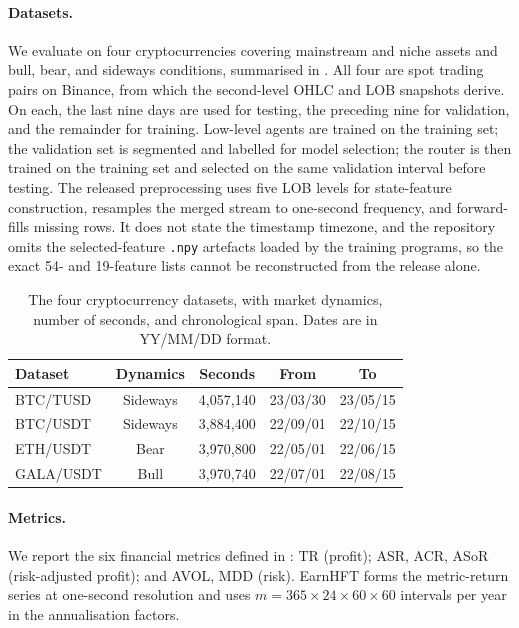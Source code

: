 \paragraph{Datasets.} We evaluate on four cryptocurrencies covering mainstream and niche assets and bull, bear, and sideways conditions, summarised in . All four are spot trading pairs on Binance, from which the second-level OHLC and LOB snapshots derive. On each, the last nine days are used for testing, the preceding nine for validation, and the remainder for training. Low-level agents are trained on the training set; the validation set is segmented and labelled for model selection; the router is then trained on the training set and selected on the same validation interval before testing. The released preprocessing uses five LOB levels for state-feature construction, resamples the merged stream to one-second frequency, and forward-fills missing rows. It does not state the timestamp timezone, and the repository omits the selected-feature \texttt{.npy} artefacts loaded by the training programs, so the exact 54- and 19-feature lists cannot be reconstructed from the release alone.

\begin{table}[!htb]
\setlength\tabcolsep{6pt}
\centering
\caption[EarnHFT dataset statistics.]{The four cryptocurrency datasets, with market dynamics, number of seconds, and chronological span. Dates are in YY/MM/DD format.}
\label{tab:earnhft_dataset}
\begin{tabular}{lcccc}
\toprule
\textbf{Dataset} & \textbf{Dynamics} & \textbf{Seconds} & \textbf{From} & \textbf{To} \\
\midrule
BTC/TUSD & Sideways & 4{,}057{,}140 & 23/03/30 & 23/05/15 \\
BTC/USDT & Sideways & 3{,}884{,}400 & 22/09/01 & 22/10/15 \\
ETH/USDT & Bear     & 3{,}970{,}800 & 22/05/01 & 22/06/15 \\
GALA/USDT & Bull    & 3{,}970{,}740 & 22/07/01 & 22/08/15 \\
\bottomrule
\end{tabular}
\end{table}

\paragraph{Metrics.} We report the six financial metrics defined in : TR (profit); ASR, ACR, ASoR (risk-adjusted profit); and AVOL, MDD (risk). EarnHFT forms the metric-return series at one-second resolution and uses $m=365\times24\times60\times60$ intervals per year in the annualisation factors.

